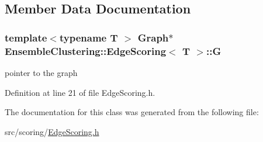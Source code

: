 \subsection{Member Data Documentation}
\hypertarget{class_ensemble_clustering_1_1_edge_scoring_a5f44e943d8b0609bb7e866d785502300}{
\subsubsection[{G}]{\setlength{\rightskip}{0pt plus 5cm}template$<$typename T $>$ {\bf Graph}$\ast$ {\bf Ensemble\-Clustering\-::\-Edge\-Scoring}$<$ T $>$\-::G\hspace{0.3cm}{\ttfamily [protected]}}}\label{class_ensemble_clustering_1_1_edge_scoring_a5f44e943d8b0609bb7e866d785502300}


pointer to the graph 



Definition at line 21 of file Edge\-Scoring.\-h.



The documentation for this class was generated from the following file\-:\begin{DoxyCompactItemize}
\item 
src/scoring/\hyperlink{_edge_scoring_8h}{Edge\-Scoring.\-h}\end{DoxyCompactItemize}
